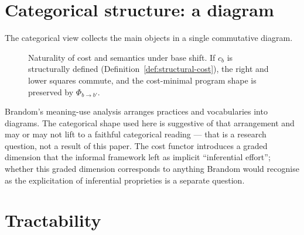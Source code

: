 \documentclass[11pt]{article}
\begin{document}
\section{Categorical structure: a diagram}

The categorical view collects the main objects in a single commutative
diagram.

\begin{figure}[t]
\centering
{}
\caption{Naturality of cost and semantics under base shift. If
$c_b$ is structurally defined (Definition~\ref{def:structural-cost}),
the right and lower squares commute, and the cost-minimal program
shape is preserved by $\Phi_{b\to b'}$.}
\label{fig:diagram}
\end{figure}

Brandom's meaning-use analysis
\parencite{brandom2008meaning, brandom1994making} arranges practices and
vocabularies into diagrams. The categorical shape used here is
suggestive of that arrangement and may or may not lift to a faithful
categorical reading --- that is a research question, not a result of
this paper. The cost functor introduces a graded dimension that the
informal framework left as implicit ``inferential effort''; whether
this graded dimension corresponds to anything Brandom would recognise
as the explicitation of inferential proprieties is a separate
question.

\section{Tractability}
\end{document}
